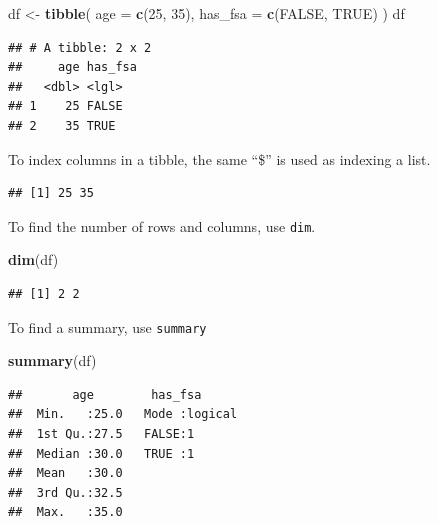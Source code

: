 \documentclass[
  openany]{book}
\newenvironment{Shaded}{\begin{snugshade}}{\end{snugshade}}
\newcommand{\DataTypeTok}[1]{\textcolor[rgb]{0.13,0.29,0.53}{#1}}
\newcommand{\DecValTok}[1]{\textcolor[rgb]{0.00,0.00,0.81}{#1}}
\newcommand{\KeywordTok}[1]{\textcolor[rgb]{0.13,0.29,0.53}{\textbf{#1}}}
\newcommand{\NormalTok}[1]{#1}
\newcommand{\OperatorTok}[1]{\textcolor[rgb]{0.81,0.36,0.00}{\textbf{#1}}}
\newcommand{\OtherTok}[1]{\textcolor[rgb]{0.56,0.35,0.01}{#1}}
\newcommand{\StringTok}[1]{\textcolor[rgb]{0.31,0.60,0.02}{#1}}
\begin{document}
\begin{Shaded}
\begin{Highlighting}[]
\NormalTok{df <-}\StringTok{ }\KeywordTok{tibble}\NormalTok{(}
  \DataTypeTok{age =} \KeywordTok{c}\NormalTok{(}\DecValTok{25}\NormalTok{, }\DecValTok{35}\NormalTok{), }\DataTypeTok{has_fsa =} \KeywordTok{c}\NormalTok{(}\OtherTok{FALSE}\NormalTok{, }\OtherTok{TRUE}\NormalTok{)}
\NormalTok{)}
\NormalTok{df}
\end{Highlighting}
\end{Shaded}

\begin{verbatim}
## # A tibble: 2 x 2
##     age has_fsa
##   <dbl> <lgl>  
## 1    25 FALSE  
## 2    35 TRUE
\end{verbatim}

To index columns in a tibble, the same ``\$'' is used as indexing a list.

\begin{Shaded}
\end{Shaded}

\begin{verbatim}
## [1] 25 35
\end{verbatim}

To find the number of rows and columns, use \texttt{dim}.

\begin{Shaded}
\begin{Highlighting}[]
\KeywordTok{dim}\NormalTok{(df)}
\end{Highlighting}
\end{Shaded}

\begin{verbatim}
## [1] 2 2
\end{verbatim}

To find a summary, use \texttt{summary}

\begin{Shaded}
\begin{Highlighting}[]
\KeywordTok{summary}\NormalTok{(df)}
\end{Highlighting}
\end{Shaded}

\begin{verbatim}
##       age        has_fsa       
##  Min.   :25.0   Mode :logical  
##  1st Qu.:27.5   FALSE:1        
##  Median :30.0   TRUE :1        
##  Mean   :30.0                  
##  3rd Qu.:32.5                  
##  Max.   :35.0
\end{verbatim}
\end{document}
